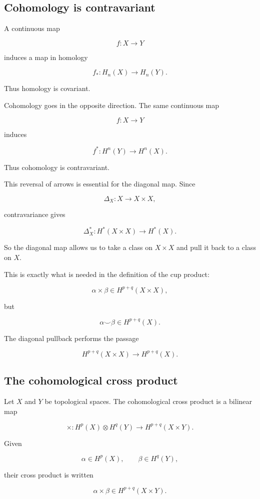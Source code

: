 \documentclass[12pt,a4paper]{article}
\theoremstyle{notespace}
\begin{document}
\subsection{Cohomology is contravariant}

A continuous map

\[
f:X\to Y
\]

induces a map in homology

\[
f_*:H_n(X)\to H_n(Y).
\]

Thus homology is covariant.

Cohomology goes in the opposite direction. The same continuous map

\[
f:X\to Y
\]

induces

\[
f^*:H^n(Y)\to H^n(X).
\]

Thus cohomology is contravariant.

This reversal of arrows is essential for the diagonal map. Since

\[
\Delta_X:X\to X\times X,
\]

contravariance gives

\[
\Delta_X^*:H^*(X\times X)\to H^*(X).
\]

So the diagonal map allows us to take a class on \(X\times X\) and pull it back to a class on \(X\).

This is exactly what is needed in the definition of the cup product:

\[
\alpha\times\beta\in H^{p+q}(X\times X),
\]

but

\[
\alpha\smile\beta\in H^{p+q}(X).
\]

The diagonal pullback performs the passage

\[
H^{p+q}(X\times X)
\longrightarrow
H^{p+q}(X).
\]

\subsection{The cohomological cross product}

Let \(X\) and \(Y\) be topological spaces. The cohomological cross product is a bilinear map

\[
\times:
H^p(X)\otimes H^q(Y)
\longrightarrow
H^{p+q}(X\times Y).
\]

Given

\[
\alpha\in H^p(X),
\qquad
\beta\in H^q(Y),
\]

their cross product is written

\[
\alpha\times\beta\in H^{p+q}(X\times Y).
\]
\end{document}
